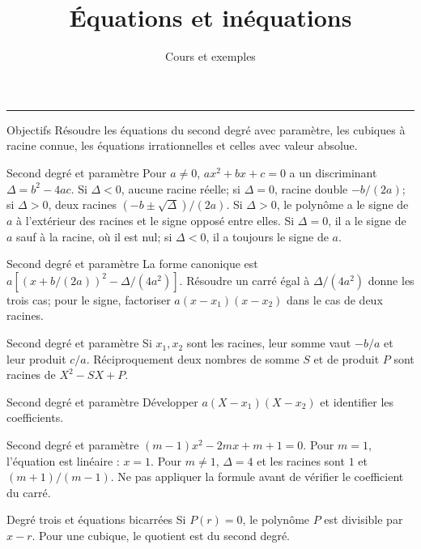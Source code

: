 \documentclass[aspectratio=169,10pt]{beamer}
\title{Équations et inéquations}
\subtitle{Cours et exemples}
\date{}
\author{}
\begin{document}
\begin{frame}[plain]
\vfill
{\inserttitle\par}
\medskip
{\insertsubtitle\par}
\medskip
{\rule{\textwidth}{.5pt}}
\vfill
\end{frame}
\begin{frame}{Objectifs}
Résoudre les équations du second degré avec paramètre, les cubiques à racine connue, les équations irrationnelles et celles avec valeur absolue.
\end{frame}
\begin{frame}{Second degré et paramètre}
Pour \(a\ne0\), \(ax^2+bx+c=0\) a un discriminant \(\Delta=b^2-4ac\). Si \(\Delta<0\), aucune racine réelle; si \(\Delta=0\), racine double \(-b/(2a)\); si \(\Delta>0\), deux racines \((-b\pm\sqrt\Delta)/(2a)\). Si \(\Delta>0\), le polynôme a le signe de \(a\) à l’extérieur des racines et le signe opposé entre elles. Si \(\Delta=0\), il a le signe de \(a\) sauf à la racine, où il est nul; si \(\Delta<0\), il a toujours le signe de \(a\).
\end{frame}
\begin{frame}{Second degré et paramètre}
La forme canonique est \(a[(x+b/(2a))^2-\Delta/(4a^2)]\). Résoudre un carré égal à \(\Delta/(4a^2)\) donne les trois cas; pour le signe, factoriser \(a(x-x_1)(x-x_2)\) dans le cas de deux racines.
\end{frame}
\begin{frame}{Second degré et paramètre}
Si \(x_1,x_2\) sont les racines, leur somme vaut \(-b/a\) et leur produit \(c/a\). Réciproquement deux nombres de somme \(S\) et de produit \(P\) sont racines de \(X^2-SX+P\).
\end{frame}
\begin{frame}{Second degré et paramètre}
Développer \(a(X-x_1)(X-x_2)\) et identifier les coefficients.
\end{frame}
\begin{frame}{Second degré et paramètre}
\((m-1)x^2-2mx+m+1=0\). Pour \(m=1\), l’équation est linéaire : \(x=1\). Pour \(m\ne1\), \(\Delta=4\) et les racines sont \(1\) et \((m+1)/(m-1)\). Ne pas appliquer la formule avant de vérifier le coefficient du carré.
\end{frame}
\begin{frame}{Degré trois et équations bicarrées}
Si \(P(r)=0\), le polynôme \(P\) est divisible par \(x-r\). Pour une cubique, le quotient est du second degré.
\end{frame}
\end{document}
